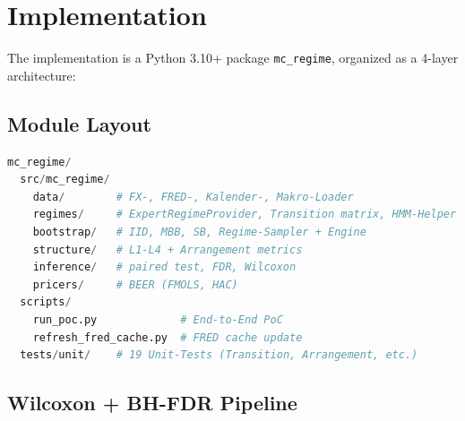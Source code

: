 \documentclass[11pt,a4paper]{article}
\theoremstyle{definition}
\begin{document}
\section{Implementation}
\label{sec:implementation}

The implementation is a Python 3.10+ package \texttt{mc\_regime}, organized as a 4-layer architecture:

\begin{center}
\end{center}

\subsection{Module Layout}

\begin{lstlisting}[language=Python,caption={Module Layout (abridged)}]
mc_regime/
  src/mc_regime/
    data/        # FX-, FRED-, Kalender-, Makro-Loader
    regimes/     # ExpertRegimeProvider, Transition matrix, HMM-Helper
    bootstrap/   # IID, MBB, SB, Regime-Sampler + Engine
    structure/   # L1-L4 + Arrangement metrics
    inference/   # paired test, FDR, Wilcoxon
    pricers/     # BEER (FMOLS, HAC)
  scripts/
    run_poc.py             # End-to-End PoC
    refresh_fred_cache.py  # FRED cache update
  tests/unit/    # 19 Unit-Tests (Transition, Arrangement, etc.)
\end{lstlisting}

\subsection{Wilcoxon + BH-FDR Pipeline}
\end{document}

